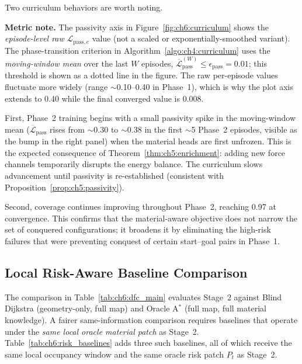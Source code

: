 Two curriculum behaviors are worth noting.

\textbf{Metric note.}
The passivity axis in Figure~\ref{fig:ch6:curriculum} shows the
\emph{episode-level raw} $\mathcal{L}_{\mathrm{pass},e}$ value (not
a scaled or exponentially-smoothed variant).
The phase-transition criterion in Algorithm~\ref{algo:ch4:curriculum}
uses the \emph{moving-window mean} over the last $W$ episodes,
$\overline{\mathcal{L}}_{\mathrm{pass}}^{(W)} \leq \epsilon_{\mathrm{pass}} = 0.01$;
this threshold is shown as a dotted line in the figure.
The raw per-episode values fluctuate more widely (range $\sim$0.10--0.40
in Phase~1), which is why the plot axis extends to 0.40 while the
final converged value is 0.008.

First, Phase~2 training begins with a small passivity spike in the
moving-window mean
($\overline{\mathcal{L}}_{\mathrm{pass}}$ rises from $\sim$0.30 to $\sim$0.38
in the first $\sim$5 Phase~2 episodes, visible as the bump in the right panel)
when the material heads are first unfrozen.
This is the expected consequence of Theorem~\ref{thm:ch5:enrichment}:
adding new force channels temporarily disrupts the energy balance.
The curriculum slows advancement until passivity is re-established
(consistent with Proposition~\ref{prop:ch5:passivity}).

Second, coverage continues improving throughout Phase~2, reaching 0.97
at convergence.
This confirms that the material-aware objective does not narrow
the set of conquered configurations; it broadens it by eliminating
the high-risk failures that were preventing conquest of certain
start–goal pairs in Phase~1.

\subsection{Local Risk-Aware Baseline Comparison}
\label{subsec:ch6:risk_baseline}

The comparison in Table~\ref{tab:ch6:dfc_main} evaluates Stage~2 against
Blind Dijkstra (geometry-only, full map) and Oracle A$^*$ (full map,
full material knowledge).
A fairer same-information comparison requires baselines that operate under
the \emph{same local oracle material patch} as Stage~2.
Table~\ref{tab:ch6:risk_baselines} adds three such baselines, all of
which receive the same local occupancy window and the same oracle
risk patch $P_t$ as Stage~2.

